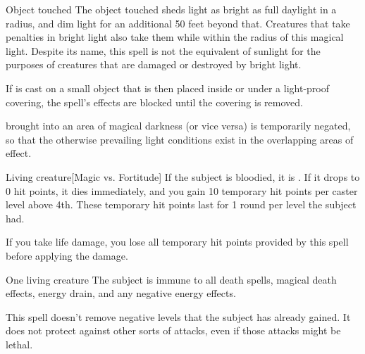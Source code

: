 \spellrng{\rngtouch}
\spelldur{\durlong \dismissable}
\begin{spelltarget}{Object touched}
    \spelleffect The object touched sheds light as bright as full daylight in a \arealarge radius, and dim light for an additional 50 feet beyond that. Creatures that take penalties in bright light also take them while within the radius of this magical light. Despite its name, this spell is not the equivalent of sunlight for the purposes of creatures that are damaged or destroyed by bright light.
    \par If  is cast on a small object that is then placed inside or under a light-proof covering, the spell's effects are blocked until the covering is removed.
\end{spelltarget}
\spellnotes {} brought into an area of magical darkness (or vice versa) is temporarily negated, so that the otherwise prevailing light conditions exist in the overlapping areas of effect.

\spellrng{\rngmed}
\begin{spelltarget}{Living creature}[Magic vs. Fortitude]
    \spellsuccess If the subject is bloodied, it is \vulnerable. If it drops to 0 hit points, it dies immediately, and you gain 10 temporary hit points  per caster level above 4th. These temporary hit points last for 1 round per level the subject had.
\end{spelltarget}
\spellnotes If you take life damage, you lose all temporary hit points provided by this spell before applying the damage.

\spellrng{\rngclose}
\spelldur{\durshort}
\begin{spelltarget}{One living creature}
    \spelleffect The subject is immune to all death spells, magical death effects, energy drain, and any negative energy effects.
\end{spelltarget}
\spellnotes This spell doesn't remove negative levels that the subject has already gained. It does not protect against other sorts of attacks, even if those attacks might be lethal.

